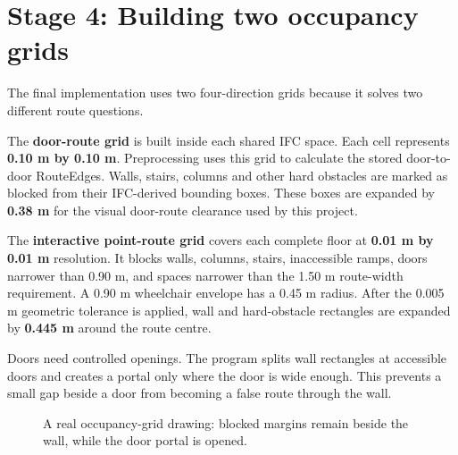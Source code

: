 \documentclass[11pt,a4paper]{article}
\newcommand{\term}[1]{\textbf{#1}}
\newcommand{\door}[2]{\fill[green] (#1-0.16,#2-0.32) rectangle (#1+0.16,#2+0.32);}
\begin{document}
\section{Stage 4: Building two occupancy grids}
The final implementation uses two four-direction grids because it solves two different route questions.

The \term{door-route grid} is built inside each shared IFC space. Each cell represents \term{0.10 m by 0.10 m}. Preprocessing uses this grid to calculate the stored door-to-door RouteEdges. Walls, stairs, columns and other hard obstacles are marked as blocked from their IFC-derived bounding boxes. These boxes are expanded by \term{0.38 m} for the visual door-route clearance used by this project.

The \term{interactive point-route grid} covers each complete floor at \term{0.01 m by 0.01 m} resolution. It blocks walls, columns, stairs, inaccessible ramps, doors narrower than 0.90 m, and spaces narrower than the 1.50 m route-width requirement. A 0.90 m wheelchair envelope has a 0.45 m radius. After the 0.005 m geometric tolerance is applied, wall and hard-obstacle rectangles are expanded by \term{0.445 m} around the route centre.

Doors need controlled openings. The program splits wall rectangles at accessible doors and creates a portal only where the door is wide enough. This prevents a small gap beside a door from becoming a false route through the wall.

\begin{figure}[H]\centering
{}
\caption{A real occupancy-grid drawing: blocked margins remain beside the wall, while the door portal is opened.}
\end{figure}
\end{document}

